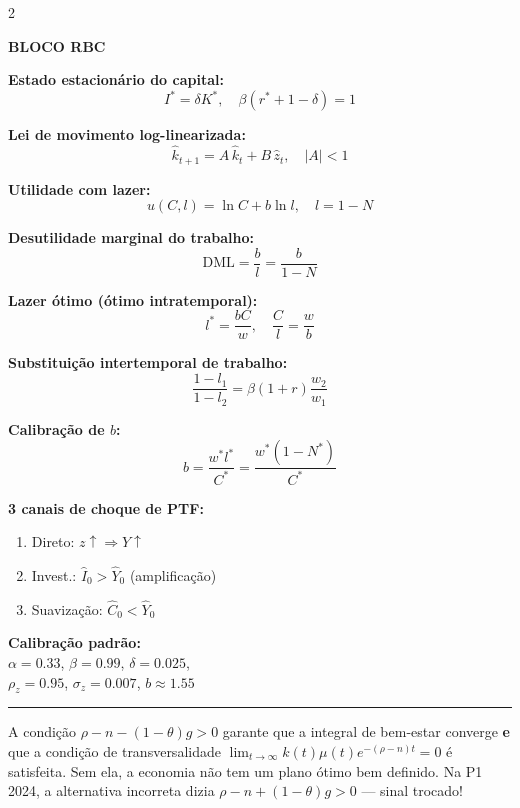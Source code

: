 \documentclass[12pt, a4paper]{article}
\newcommand{\khat}{\hat{k}}
\newcommand{\zhat}{\hat{z}}
\newcommand{\rstar}{r^*}
\begin{document}
\begin{multicols}{2}
\columnbreak

\textbf{\textcolor{cyanrbc}{BLOCO RBC}}

\medskip
\textbf{Estado estacionário do capital:}
\[
I^* = \delta K^*, \quad \beta(\rstar + 1 - \delta) = 1
\]

\textbf{Lei de movimento log-linearizada:}
\[
\khat_{t+1} = A\,\khat_t + B\,\zhat_t, \quad |A| < 1
\]

\textbf{Utilidade com lazer:}
\[
u(C,l) = \ln C + b\ln l, \quad l = 1-N
\]

\textbf{Desutilidade marginal do trabalho:}
\[
\text{DML} = \frac{b}{l} = \frac{b}{1-N}
\]

\textbf{Lazer ótimo (ótimo intratemporal):}
\[
l^* = \frac{bC}{w}, \quad \frac{C}{l} = \frac{w}{b}
\]

\textbf{Substituição intertemporal de trabalho:}
\[
\frac{1-l_1}{1-l_2} = \beta(1+r)\frac{w_2}{w_1}
\]

\textbf{Calibração de $b$:}
\[
b = \frac{w^* l^*}{C^*} = \frac{w^*(1-N^*)}{C^*}
\]

\textbf{3 canais de choque de PTF:}
\begin{enumerate}[leftmargin=1.2em, topsep=0pt, itemsep=1pt, parsep=0pt]
\item Direto: $z\uparrow \Rightarrow Y\uparrow$
\item Invest.: $\hat{I}_0 > \hat{Y}_0$ (amplificação)
\item Suavização: $\hat{C}_0 < \hat{Y}_0$
\end{enumerate}

\medskip
\textbf{Calibração padrão:}\\[2pt]
$\alpha=0.33$, $\beta=0.99$, $\delta=0.025$,\\
$\rho_z=0.95$, $\sigma_z=0.007$, $b\approx 1.55$

\end{multicols}

\rule{\linewidth}{0.6pt}

\vspace{0.5em}
\begin{provabox}[title={Convergência e transversalidade (fórmula mais cobrada)}]
A condição $\rho - n - (1-\theta)g > 0$ garante que a integral de bem-estar converge
\textbf{e} que a condição de transversalidade $\lim_{t\to\infty} k(t)\mu(t)e^{-(\rho-n)t}=0$
é satisfeita. Sem ela, a economia não tem um plano ótimo bem definido.
Na P1 2024, a alternativa incorreta dizia $\rho - n + (1-\theta)g > 0$ --- sinal trocado!
\end{provabox}
\end{document}

